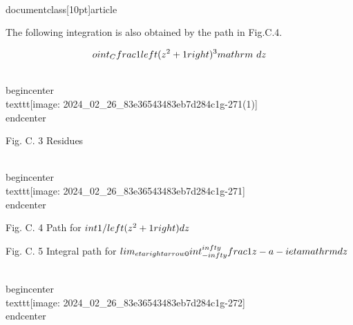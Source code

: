 \\documentclass[10pt]{article}
\begin{document}
{{{{{{The following integration is also obtained by the path in Fig.C.4.

$$
\\oint_{C} \\frac{1}{\\left(z^{2}+1\\right)^{3}} \\mathrm{~d} z
$$

\\begin{center}
\\texttt{[image: 2024\_02\_26\_83e36543483eb7d284c1g-271(1)]}
\\end{center}

Fig. C. 3 Residues

\\begin{center}
\\texttt{[image: 2024\_02\_26\_83e36543483eb7d284c1g-271]}
\\end{center}

Fig. C. 4 Path for $\\int 1 /\\left(z^{2}+1\\right) d z$

Fig. C. 5 Integral path for $\\lim _{\\eta \\rightarrow 0} \\int_{-\\infty}^{\\infty} \\frac{1}{z-a-i \\eta} \\mathrm{d} z$

\\begin{center}
\\texttt{[image: 2024\_02\_26\_83e36543483eb7d284c1g-272]}
\\end{center}

}}}}}}
\end{document}
